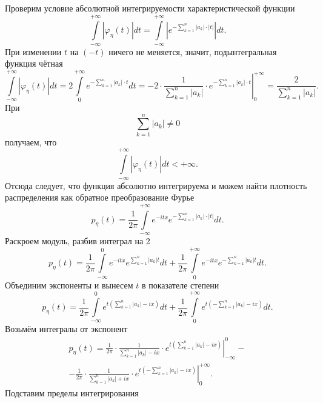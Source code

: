 Проверим условие абсолютной интегрируемости характеристической функции
$$ \int \limits_{- \infty }^{+ \infty } \left| \varphi_{ \eta } \left( t \right) \right| dt =
\int \limits_{- \infty }^{+ \infty } \left| e^{- \sum \limits_{k = 1}^n \left| a_k \right| \cdot \left| t \right| } \right| dt.$$
При изменении $t$ на $ \left( - t \right) $ ничего не меняется, значит, подынтегральная функция чётная
$$ \int \limits_{- \infty }^{+ \infty } \left| \varphi_{ \eta } \left( t \right) \right| dt =
2 \int \limits_0^{+ \infty } e^{- \sum \limits_{k = 1}^n \left| a_k \right| \cdot t} dt =
\left. - 2 \cdot \frac{1}{ \sum \limits_{k = 1}^n \left| a_k \right| } \cdot e^{- \sum \limits_{k = 1}^n \left| a_k \right| \cdot t} \right|_0^{+ \infty } =
\frac{2}{ \sum \limits_{k = 1}^n \left| a_k \right| }.$$
При
$$\sum \limits_{k = 1}^n \left| a_k \right| \neq
0$$
получаем, что
$$ \int \limits_{- \infty }^{+ \infty } \left| \varphi_{ \eta } \left( t \right) \right| dt <
+ \infty.$$
Отсюда следует, что функция абсолютно интегрируема и можем найти плотность распределения как обратное преобразование Фурье
$$p_{ \eta } \left( t \right) =
\frac{1}{2 \pi } \int \limits_{- \infty }^{+ \infty } e^{- itx} e^{- \sum \limits_{k = 1}^n \left| a_k \right| \cdot \left| t \right| } dt.$$
Раскроем модуль, разбив интеграл на 2
$$p_{ \eta } \left( t \right) =
\frac{1}{2 \pi } \int \limits_{- \infty }^0 e^{- itx} e^{ \sum \limits_{k = 1}^n \left| a_k \right| t} dt +
\frac{1}{2 \pi } \int \limits_0^{+ \infty } e^{- itx} e^{- \sum \limits_{k = 1}^n \left| a_k \right| t} dt.$$
Объединим экспоненты и вынесем $t$ в показателе степени
$$p_{ \eta } \left( t \right) =
\frac{1}{2 \pi } \int \limits_{- \infty }^0 e^{t \left( \sum \limits_{k = 1}^n \left| a_k \right| - ix \right) } dt +
\frac{1}{2 \pi } \int \limits_0^{+ \infty } e^{t \left( - \sum \limits_{k = 1}^n \left| a_k \right| - ix \right) } dt.$$
Возьмём интегралы от экспонент
\begin{equation*}
\begin{split}
p_{ \eta } \left( t \right) =
\frac{1}{2 \pi } \cdot \left. \frac{1}{ \sum \limits_{k = 1}^n \left| a_k \right| - ix} \cdot
e^{t \left( \sum \limits_{k = 1}^n \left| a_k \right| - ix \right) } \right|_{- \infty }^0 - \\
- \frac{1}{2 \pi } \cdot \left. \frac{1}{ \sum \limits_{k = 1}^n \left| a_k \right| + ix} \cdot
e^{t \left( - \sum \limits_{k = 1}^n \left| a_k \right| - ix \right) } \right|_0^{+ \infty }.
\end{split}
\end{equation*}
Подставим пределы интегрирования
